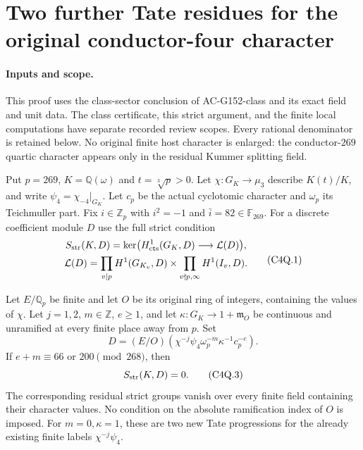 \section{Two further Tate residues for the original conductor-four character}
\label{sec:conductor4-quartic-residue-strict}

\paragraph{Inputs and scope.}
This proof uses the class-sector conclusion of AC-G152-class and
its exact field and unit data.  The class certificate, this strict
argument, and the finite local computations have separate recorded
review scopes.  Every rational denominator is retained below.
No original finite host character is enlarged: the conductor-$269$
quartic character appears only in the residual Kummer splitting field.

Put $p=269$, $K=\mathbb Q(\omega)$ and $t=\sqrt[3]p>0$.
Let $\chi:G_K\to\mu_3$ describe $K(t)/K$, and write
$\psi_4=\chi_{-4}|_{G_K}$.
Let $c_p$ be the actual cyclotomic character and $\omega_p$ its
Teichmuller part.  Fix $i\in\mathbb Z_p$ with $i^2=-1$ and
$\bar i=82\in\mathbb F_{269}$.
For a discrete coefficient module $D$ use the full strict condition
\[
 \begin{gathered}
 S_{\rm str}(K,D)=\ker\bigl(H^1_{\rm cts}(G_K,D)
                                      \longrightarrow\mathcal L(D)\bigr),\\
 \mathcal L(D)=\prod_{v\mid p}H^1(G_{K_v},D)
             \times\prod_{v\nmid p,\infty}H^1(I_v,D).
 \end{gathered}
 \tag{C4Q.1}
\]

\begin{theorem}
\label{AC-G152}
Let $E/\mathbb Q_p$ be finite and let $O$ be its original ring of
integers, containing the values of $\chi$.
Let $j=1,2$, $m\in\mathbb Z$, $e\geq1$, and let
$\kappa:G_K\to1+\mathfrak m_O$ be continuous and unramified
at every finite place away from $p$.
Set
\[
 D=(E/O)(\chi^{-j}\psi_4\omega_p^{-m}\kappa^{-1}c_p^{-e}).
 \tag{C4Q.2}
\]
If
$e+m\equiv66$ or $200\pmod{268}$, then
\[
                         S_{\rm str}(K,D)=0.
 \tag{C4Q.3}
\]
The corresponding residual strict groups vanish over every finite
field containing their character values.
No condition on the absolute ramification index of $O$ is imposed.
For $m=0,\kappa=1$, these are two new Tate progressions for the
already existing finite labels $\chi^{-j}\psi_4$.
\end{theorem}

